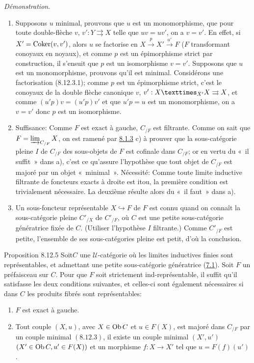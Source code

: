 \documentclass[10pt]{../fichiers-configuration-latex/smfart}
\def\labelenumi{(\theenumi)}
\begin{document}
\noindent \emph{Démonstration}.\pageoriginale
\begin{enumerate}
\renewcommand{\theenumi}{\alph{enumi}}
\renewcommand{\labelenumi}{\theenumi)}
\item Supposons $u$ minimal, prouvons que $u$ est un monomorphisme,
\ie que pour toute double-flèche $v$, $v':Y\rightrightarrows X$
telle que $uv=uv'$, on a $v=v'$. En effet, si $X'=\operatorname{Coker}(v,v')$,
alors $u$ se factorise en $X\xrightarrow{p}X'\xrightarrow{u'}F$ ($F$
transformant conoyaux en noyaux), et comme $p$ est un épimorphisme
strict par construction, il s'ensuit que $p$ est un isomorphisme \ie
$v=v'$. Supposons que $u$ est un monomorphisme, prouvons qu'il est
minimal. Considérons une factorisation (8.12.3.1); comme $p$ est un
épimorphisme strict, c'est le conoyaux de la double flèche canonique
$v$, $v':\fprod{X}{X}{X'}\rightrightarrows X$, et comme
$(u'p)v=(u'p)v'$ et que $u'p=u$ est un monomorphisme, on a $v=v'$
donc $p$ est un isomorphisme.

\item Suffisance: Comme $F$ est exact à gauche, $C_{/F}$ est
filtrante. Comme on sait que $F=\varinjlim_{C_{/F}}X$, on est ramené
par \hyperref[I.prop8.1.3]{8.1.3} c) à prouver que la sous-catégorie pleine $I$
de $C_{/F}$ des sous-objets de $F$ est cofinale dans $C_{/F}$; or en
vertu du « il suffit » dans a), c'est ce qu'assure l'hypothèse
que tout objet de $C_{/F}$ est majoré par un objet « minimal ».
Nécessité: Comme toute limite inductive filtrante de foncteurs
exacts à droite est itou, la première condition est trivialement
nécessaire. La deuxième résulte alors du « il faut » dans a).

\item Un sous-foncteur représentable $X\hookrightarrow F$ de $F$ est
connu quand on connaît la sous-catégorie pleine $C'_{/X}$ de
$C'_{/F}$, où $C$ est une petite sous-catégorie génératrice fixée de
$C$. (Utiliser l'hypothèse $I$ filtrante.) Comme $C'_{/F}$ est
petite, l'ensemble de ses sous-catégories pleine est petit, d'où la
conclusion.
\end{enumerate}

\begin{enonce*}{Proposition 8.12.5}
Soit\pageoriginale $C$ une $𝒰$-catégorie où les limites
inductives finies sont représentables, et admettant une petite
sous-catégorie génératrice (\hyperref[I.def7.1]{7.1}). Soit $F$ un
préfaisceau sur $C$.
Pour que $F$ soit strictement ind-représentable, il suffit qu'il
satisfasse les deux conditions suivantes, et celles-ci sont
également nécessaires si dans $C$ les produits fibrés sont
représentables:
\begin{enumerate}
\renewcommand{\theenumi}{\alph{enumi}}
\renewcommand{\labelenumi}{\theenumi)}
\item $F$ est exact à gauche.

\item Tout couple $(X,u)$, avec $X\in \operatorname{Ob} C$ et $u\in F(X)$, est
majoré dans $C_{/F}$ par un couple minimal $(8.12.3)$, \ie il existe
un couple minimal $(X',u')$ $(X'\in \operatorname{Ob} C, u'\in F(X))$ et un
morphisme $f:X\rightarrow X'$ tel que $u=F(f)(u')$.
\end{enumerate}
\end{enonce*}
\end{document}
